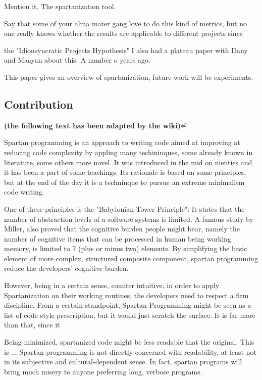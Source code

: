 Mention it. The spartanization tool.

Say that some of your alma mater gang love to do this kind of metrics, but
no one really knows whether the results are applicable to different projects
since
\cite{Turnu:Concas:Marchesi:Tonelli:11}

the "Idionsyncratic Projects Hypothesis" I also had a plateau paper with
Dany and Maayan about this. A number o years ago.

This paper gives an overview of spartanization, future work will be
experiments.

\subsection{Contribution}

\textbf{(the following text has been adapted by the wiki)}⏎

Spartan programming is an approach to writing code aimed at improving at
reducing code complexity by appling many techininques, some already known in
literature, some others more novel. It was introduced in the mid on nienties
and it has been a part of some teachings. Its rationale is based on some
principles, but at the end of the day it is a techninque to pursue an extreme
minimalism code writing.

One of these principles is the "Babylonian Tower Principle": It states that the
number of abstraction levels of a software systems is limited. A famous study
by Miller, also proved that the cognitive burden people might bear, namely the
number of cognitive items that can be processed in human being working memory,
is limited to 7 (plus or minus two) elements. By simplifying the basic element
of more complex, structured composite component, spartan programming reduce the
developers' cognitive burden.

However, being in a certain sense, counter intuitive, in order to apply
Spartanization on their working routines, the developers need to respect a firm
discipline. From a certain standpoint, Spartan Programming might be seen as a
list of code style prescription, but it would just scratch the surface. It is
far more than that, since it

Being minimized, spartanized code might be less readable that the original.
This is ... Spartan programming is not directly concerned with readability, at
least not in its subjective and cultural-dependent sense. In fact, spartan
programs will bring much misery to anyone preferring long, verbose programs.

